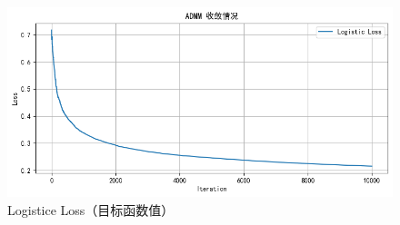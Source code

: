 \documentclass{homework}
\begin{document}
\begin{sol}
\begin{figure}[h]
    \centering
    \includegraphics[width=0.6\linewidth]{4.png}
    \caption{Logistice Loss（目标函数值）}
    \label{4}
\end{figure}

\end{sol}

% 
% 
\end{document}
